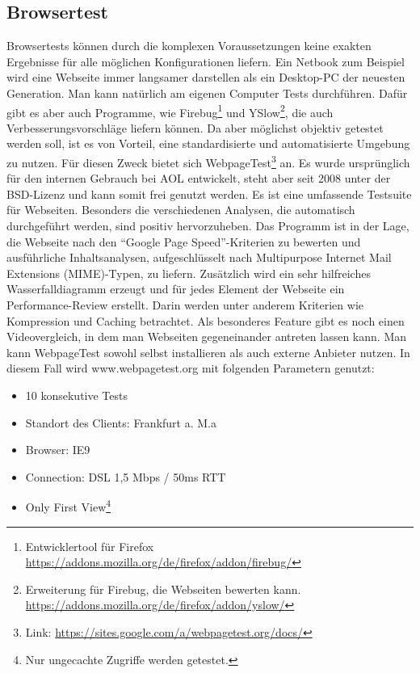 \subsection{Browsertest}
Browsertests k\"onnen durch die komplexen Voraussetzungen keine exakten Ergebnisse f\"ur alle m\"oglichen Konfigurationen liefern. Ein Netbook zum Beispiel wird eine Webseite immer langsamer darstellen als ein Desktop-PC der neuesten Generation. Man kann natürlich am eigenen Computer Tests durchführen. Dafür gibt es aber auch Programme, wie Firebug\footnote{Entwicklertool f\"ur Firefox \url{https://addons.mozilla.org/de/firefox/addon/firebug/}} und YSlow\footnote{Erweiterung f\"ur Firebug, die Webseiten bewerten kann. \url{https://addons.mozilla.org/de/firefox/addon/yslow/}}, die auch Verbesserungsvorschläge liefern können. Da aber möglichst objektiv getestet werden soll, ist es von Vorteil, eine standardisierte und automatisierte Umgebung zu nutzen. Für diesen Zweck bietet sich WebpageTest\footnote{Link: \url{https://sites.google.com/a/webpagetest.org/docs/}} an. Es wurde ursprünglich für den internen Gebrauch bei AOL entwickelt, steht aber seit 2008 unter der BSD-Lizenz und kann somit frei genutzt werden. Es ist eine umfassende Testsuite für Webseiten. Besonders die verschiedenen Analysen, die automatisch durchgeführt werden, sind positiv hervorzuheben. Das Programm ist in der Lage, die Webseite nach den "`Google Page Speed"'-Kriterien zu bewerten und ausführliche Inhaltsanalysen, aufgeschlüsselt nach Multipurpose Internet Mail Extensions (MIME)-Typen, zu liefern. Zusätzlich wird ein sehr hilfreiches Wasserfalldiagramm erzeugt und für jedes Element der Webseite ein Performance-Review erstellt. Darin werden unter anderem Kriterien wie Kompression und Caching betrachtet. Als besonderes Feature gibt es noch einen Videovergleich, in dem man Webseiten gegeneinander antreten lassen kann. Man kann WebpageTest sowohl selbst installieren als auch externe Anbieter nutzen. In diesem Fall wird www.webpagetest.org mit folgenden Parametern genutzt:
\begin{itemize}
  \item 10 konsekutive Tests
  \item Standort des Clients: Frankfurt a. M.a
  \item Browser: IE9
  \item Connection: DSL 1,5 Mbps / 50ms RTT
  \item Only First View\footnote{Nur ungecachte Zugriffe werden getestet.}
\end{itemize}
